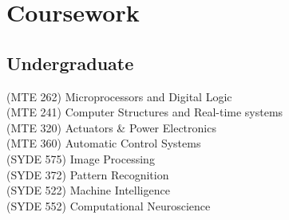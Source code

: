 \documentclass[]{deedy-resume-openfont}
\begin{document}
\begin{minipage}[t]{0.33\textwidth}

\section{Coursework}
\subsection{Undergraduate}
(MTE 262) Microprocessors and Digital Logic\\
(MTE 241) Computer Structures and Real-time systems \\
(MTE 320) Actuators \& Power Electronics\\
(MTE 360) Automatic Control Systems\\
(SYDE 575) Image Processing\\
(SYDE 372) Pattern Recognition\\
(SYDE 522) Machine Intelligence\\
(SYDE 552) Computational Neuroscience\\
\sectionsep


%
%

\end{minipage}
\hfill
\end{document}
